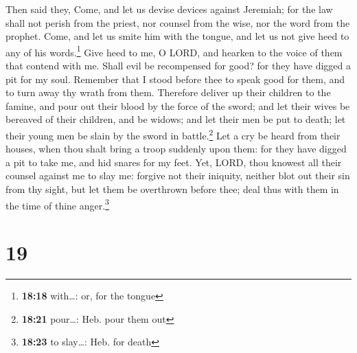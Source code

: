  Then said they, Come, and let us devise devices against
Jeremiah; for the law shall not perish from the priest, nor counsel from
the wise, nor the word from the prophet. Come, and let us smite him with
the tongue, and let us not give heed to any of his words.\footnote{\textbf{18:18}
  with\ldots: or, for the tongue}  Give heed to me, O
LORD, and hearken to the voice of them that contend with me.
 Shall evil be recompensed for good? for they have digged
a pit for my soul. Remember that I stood before thee to speak good for
them, and to turn away thy wrath from them.  Therefore
deliver up their children to the famine, and pour out their blood by the
force of the sword; and let their wives be bereaved of their children,
and be widows; and let their men be put to death; let their young men be
slain by the sword in battle.\footnote{\textbf{18:21} pour\ldots: Heb.
  pour them out}  Let a cry be heard from their houses,
when thou shalt bring a troop suddenly upon them: for they have digged a
pit to take me, and hid snares for my feet.  Yet, LORD,
thou knowest all their counsel against me to slay me: forgive not their
iniquity, neither blot out their sin from thy sight, but let them be
overthrown before thee; deal thus with them in the time of thine
anger.\footnote{\textbf{18:23} to slay\ldots: Heb. for death}

\hypertarget{section-18}{%
\section{19}\label{section-18}}

